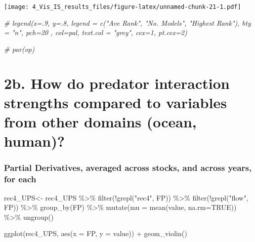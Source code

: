 \documentclass[
]{article}
\newenvironment{Shaded}{\begin{snugshade}}{\end{snugshade}}
\newcommand{\AttributeTok}[1]{\textcolor[rgb]{0.77,0.63,0.00}{#1}}
\newcommand{\CommentTok}[1]{\textcolor[rgb]{0.56,0.35,0.01}{\textit{#1}}}
\newcommand{\ConstantTok}[1]{\textcolor[rgb]{0.00,0.00,0.00}{#1}}
\newcommand{\FunctionTok}[1]{\textcolor[rgb]{0.00,0.00,0.00}{#1}}
\newcommand{\NormalTok}[1]{#1}
\newcommand{\OtherTok}[1]{\textcolor[rgb]{0.56,0.35,0.01}{#1}}
\newcommand{\SpecialCharTok}[1]{\textcolor[rgb]{0.00,0.00,0.00}{#1}}
\newcommand{\StringTok}[1]{\textcolor[rgb]{0.31,0.60,0.02}{#1}}
\begin{document}
\texttt{[image: 4\_Vis\_IS\_results\_files/figure-latex/unnamed-chunk-21-1.pdf]}

\begin{Shaded}
\begin{Highlighting}[]
\CommentTok{\# legend(x=.9, y=.8, legend = c("Ave Rank", "No. Models", "Highest Rank"), bty = "n", pch=20 , col=pal, text.col = "grey", cex=1, pt.cex=2)}


\CommentTok{\# par(op)}
\end{Highlighting}
\end{Shaded}

\hypertarget{b.-how-do-predator-interaction-strengths-compared-to-variables-from-other-domains-ocean-human-3}{%
\section{2b. How do predator interaction strengths compared to variables
from other domains (ocean,
human)?}\label{b.-how-do-predator-interaction-strengths-compared-to-variables-from-other-domains-ocean-human-3}}

\hypertarget{partial-derivatives-averaged-across-stocks-and-across-years-for-each-1}{%
\subsubsection{Partial Derivatives, averaged across stocks, and across
years, for
each}\label{partial-derivatives-averaged-across-stocks-and-across-years-for-each-1}}

\begin{Shaded}
\begin{Highlighting}[]
\NormalTok{rec4\_UPS}\OtherTok{\textless{}{-}}\NormalTok{  rec4\_UPS  }\SpecialCharTok{\%\textgreater{}\%} 
  \FunctionTok{filter}\NormalTok{(}\SpecialCharTok{!}\FunctionTok{grepl}\NormalTok{(}\StringTok{"rec4"}\NormalTok{, FP)) }\SpecialCharTok{\%\textgreater{}\%} 
  \FunctionTok{filter}\NormalTok{(}\SpecialCharTok{!}\FunctionTok{grepl}\NormalTok{(}\StringTok{"flow"}\NormalTok{, FP)) }\SpecialCharTok{\%\textgreater{}\%} 
  \FunctionTok{group\_by}\NormalTok{(FP) }\SpecialCharTok{\%\textgreater{}\%} 
  \FunctionTok{mutate}\NormalTok{(}\AttributeTok{mu =} \FunctionTok{mean}\NormalTok{(value, }\AttributeTok{na.rm=}\ConstantTok{TRUE}\NormalTok{)) }\SpecialCharTok{\%\textgreater{}\%}
  \FunctionTok{ungroup}\NormalTok{()}

\FunctionTok{ggplot}\NormalTok{(rec4\_UPS, }\FunctionTok{aes}\NormalTok{(}\AttributeTok{x =}\NormalTok{ FP, }\AttributeTok{y =}\NormalTok{ value)) }\SpecialCharTok{+} 
  \FunctionTok{geom\_violin}\NormalTok{()}
\end{Highlighting}
\end{Shaded}
\end{document}
